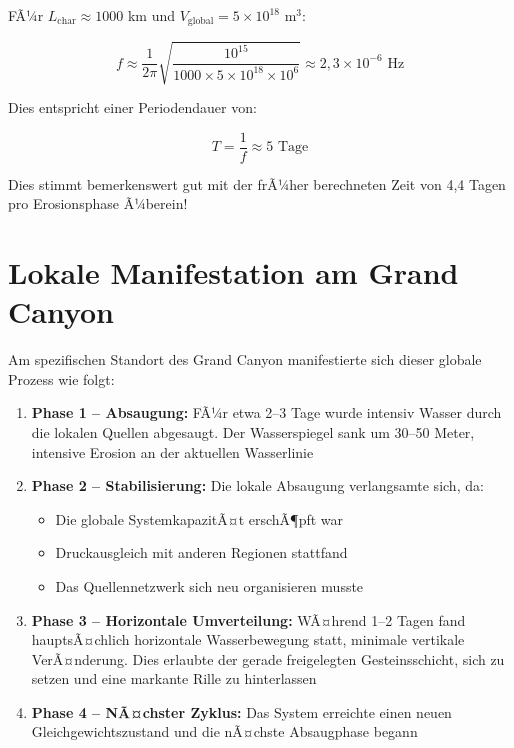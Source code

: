 ﻿\documentclass[12pt,a4paper]{report}
\begin{document}
FÃ¼r $L_{\text{char}} \approx 1000$ km und $V_{\text{global}} = 5 \times 10^{18}$ m$^3$:

\begin{equation}
	f \approx \frac{1}{2\pi} \sqrt{\frac{10^{15}}{1000 \times 5 \times 10^{18} \times 10^6}} \approx 2{,}3 \times 10^{-6} \text{ Hz}
\end{equation}

Dies entspricht einer Periodendauer von:

\begin{equation}
	T = \frac{1}{f} \approx 5 \text{ Tage}
\end{equation}

Dies stimmt bemerkenswert gut mit der frÃ¼her berechneten Zeit von 4,4 Tagen pro Erosionsphase Ã¼berein!

\section{Lokale Manifestation am Grand Canyon}

Am spezifischen Standort des Grand Canyon manifestierte sich dieser globale Prozess wie folgt:

\begin{enumerate}
	\item \textbf{Phase 1 -- Absaugung:} FÃ¼r etwa 2--3 Tage wurde intensiv Wasser durch die lokalen Quellen abgesaugt. Der Wasserspiegel sank um 30--50 Meter, intensive Erosion an der aktuellen Wasserlinie
	
	\item \textbf{Phase 2 -- Stabilisierung:} Die lokale Absaugung verlangsamte sich, da:
	\begin{itemize}
		\item Die globale SystemkapazitÃ¤t erschÃ¶pft war
		\item Druckausgleich mit anderen Regionen stattfand
		\item Das Quellennetzwerk sich neu organisieren musste
	\end{itemize}
	
	\item \textbf{Phase 3 -- Horizontale Umverteilung:} WÃ¤hrend 1--2 Tagen fand hauptsÃ¤chlich horizontale Wasserbewegung statt, minimale vertikale VerÃ¤nderung. Dies erlaubte der gerade freigelegten Gesteinsschicht, sich zu setzen und eine markante Rille zu hinterlassen
	
	\item \textbf{Phase 4 -- NÃ¤chster Zyklus:} Das System erreichte einen neuen Gleichgewichtszustand und die nÃ¤chste Absaugphase begann
\end{enumerate}
\end{document}

